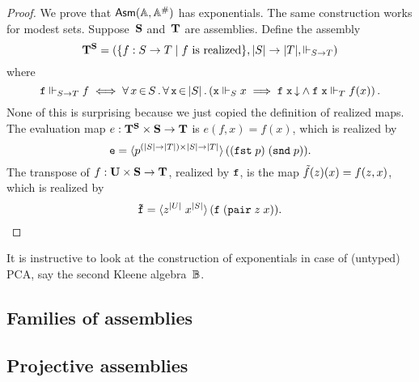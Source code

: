 \begin{proof}
  We prove that $\mathsf{Asm}(\mathbb{A},\mathbb{A}^{\#})$ has exponentials. The same construction works
  for modest sets. Suppose~$\mathbf{S}$ and~$\mathbf{T}$ are assemblies.
  Define the assembly
  \begin{equation*}
    \mathbf{T}^{\mathbf{S}} =
    (\{f : S \to T \mid \text{$f$ is realized}\},
     |S| \to |T|, {\Vdash_{S \to T}})
  \end{equation*}
  where
  \begin{equation*}
    \mathtt{f} \Vdash_{S \to T} f
    \iff
    \forall\, x \,{\in}\, S\,.\,
      \forall\, \mathtt{x} \,{\in}\, |S|\,.\left(
          \mathtt{x} \Vdash_S x \implies
          \mathtt{f}\;\mathtt{x}\,{\downarrow} \land
          \mathtt{f}\;\mathtt{x} \Vdash_T f(x)
        \right)
     .
  \end{equation*}
  None of this is surprising because we just copied the definition of
  realized maps. The evaluation map $e : \mathbf{T}^{\mathbf{S}} \times
  \mathbf{S} \to \mathbf{T}$ is $e(f, x) = f(x)$, which is realized by
  \begin{equation*}
    \mathtt{e} = \langle p^{(|S| \to |T|) \times |S| \to
      |T|} \rangle\,((\mathtt{fst}\;p)\;(\mathtt{snd}\;p)).
  \end{equation*}
  The transpose of $f : \mathbf{U} \times \mathbf{S} \to \mathbf{T}$, realized
  by $\mathtt{f}$, is the map $\tilde{f}(z)(x) = f(z,x)$, which is realized
  by
  \begin{equation*}
    \mathtt{\tilde{f}} = \langle z^{|U|} \; x^{|S|} \rangle\,(
      \mathtt{f}\;(\mathtt{pair}\;z\;x)
    ).
  \end{equation*}
\end{proof}

It is instructive to look at the construction of exponentials in case
of (untyped) PCA, say the second Kleene algebra~$\mathbb{B}$.


\subsection{Families of assemblies}
\label{sec:dependent-types}




\subsection{Projective assemblies}
\label{sec:projective-assemblies}


